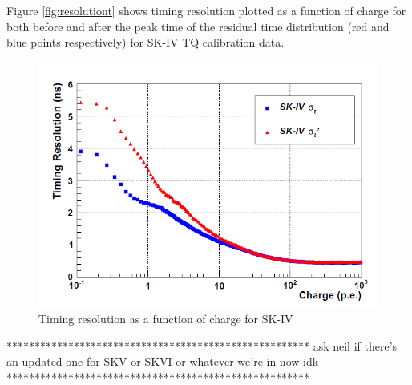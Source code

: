 Figure \ref{fig:resolutiont} shows timing resolution  plotted as a function of charge for both before and after the peak time of the residual time distribution (red and blue points respectively) for SK-IV TQ calibration data. 

\begin{figure}
    \includegraphics[width=\textwidth]{Figures/resolutiont.png}
\caption{Timing resolution as a function of charge for SK-IV}
    \label{fig:resolutiontt}
\end{figure}

******************************************************
ask neil if there's an updated one for SKV or SKVI or whatever we're in now idk
******************************************************

